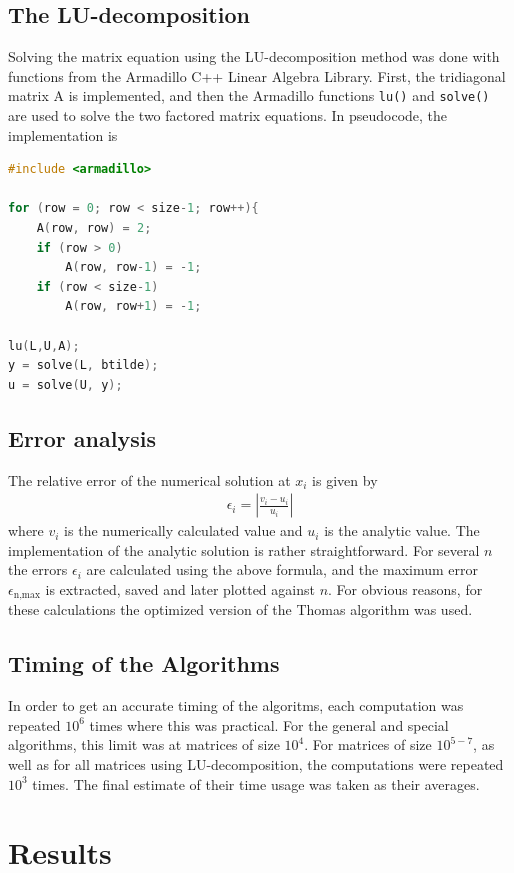 \documentclass[aps,prl,reprint,toc]{revtex4-1}
\begin{document}
\subsection{The LU-decomposition}
Solving the matrix equation using the LU-decomposition method was done with
functions from the Armadillo C++ Linear Algebra Library. First, the tridiagonal
matrix A is implemented, and then the Armadillo functions \texttt{lu()} and \texttt{solve()}
are used to solve the two factored matrix equations. In pseudocode, the implementation is
\begin{lstlisting}[language=cpp, caption={Pseudocode of LU-decomposition method implementation}]
#include <armadillo>

for (row = 0; row < size-1; row++){
    A(row, row) = 2;
    if (row > 0)
        A(row, row-1) = -1;
    if (row < size-1)
        A(row, row+1) = -1;

lu(L,U,A);
y = solve(L, btilde);
u = solve(U, y);
\end{lstlisting}
\subsection{Error analysis}
The relative error of the numerical solution at $x_i$ is given by
\begin{align*}
  \epsilon_i = \left| \frac{v_i - u_i}{u_i} \right|
\end{align*}
where $v_i$ is the numerically calculated value and $u_i$ is the analytic value.
The implementation of the analytic solution is rather straightforward. For several
$n$ the errors $\epsilon_i$ are calculated using the above formula, and the
maximum error $\epsilon_\text{n,max}$ is extracted, saved and later plotted against $n$.
For obvious reasons, for these calculations the optimized version of the Thomas algorithm was used.

\subsection{Timing of the Algorithms}
\label{sec:timingmethod}
In order to get an accurate timing of the algoritms, each computation was
repeated \(10^6\) times where this was practical. For the general and special
algorithms, this limit was at matrices of size \(10^4\). For matrices of size
\(10^{5-7}\), as well as for all matrices using LU-decomposition, the
computations were repeated \(10^{3}\) times. The final estimate of their time
usage was taken as their averages.

\section{Results}
\end{document}
